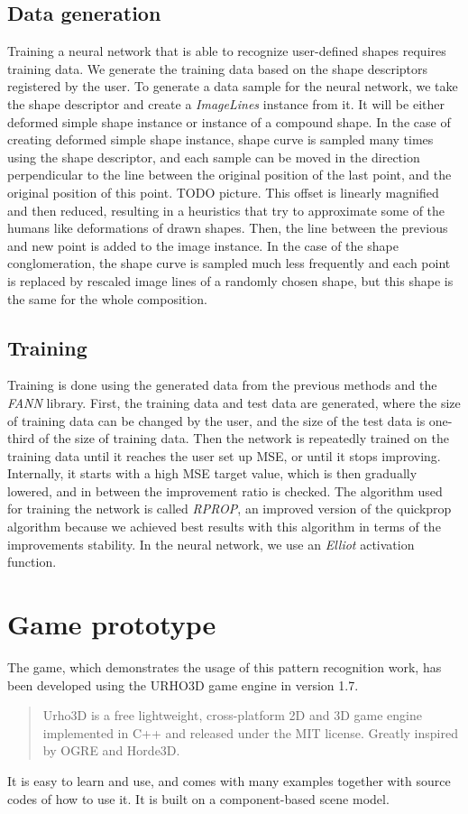 \begin{description}
\subsection{Data generation}
Training a neural network that is able to recognize user-defined shapes requires training data. We generate the training data based on the shape descriptors registered by the user. To generate a data sample for the neural network, we take the shape descriptor and create a \emph{ImageLines} instance from it. It will be either deformed simple shape instance or instance of a compound shape. In the case of creating deformed simple shape instance, shape curve is sampled many times using the shape descriptor, and each sample can be moved in the direction perpendicular to the line between the original position of the last point, and the original position of this point. TODO picture. This offset is linearly magnified and then reduced, resulting in a heuristics that try to approximate some of the humans like deformations of drawn shapes. Then, the line between the previous and new point is added to the image instance. In the case of the shape conglomeration, the shape curve is sampled much less frequently and each point is replaced by rescaled image lines of a randomly chosen shape, but this shape is the same for the whole composition.

\subsection{Training}
Training is done using the generated data from the previous methods and the \emph{FANN} library. First, the training data and test data are generated, where the size of training data can be changed by the user, and the size of the test data is one-third of the size of training data. Then the network is repeatedly trained on the training data until it reaches the user set up MSE, or until it stops improving. Internally, it starts with a high MSE target value, which is then gradually lowered, and in between the improvement ratio is checked. The algorithm used for training the network is called \emph{RPROP}, an improved version of the quickprop algorithm because we achieved best results with this algorithm in terms of the improvements stability. In the neural network, we use an \emph{Elliot} activation function.

\section{Game prototype}
The game, which demonstrates the usage of this pattern recognition work, has been developed using the URHO3D game engine in version 1.7. \begin{quotation} Urho3D is a free lightweight, cross-platform 2D and 3D game engine implemented in C++ and released under the MIT license. Greatly inspired by OGRE and Horde3D. \end{quotation} It is easy to learn and use, and comes with many examples together with source codes of how to use it. It is built on a component-based scene model. 


\end{description}
